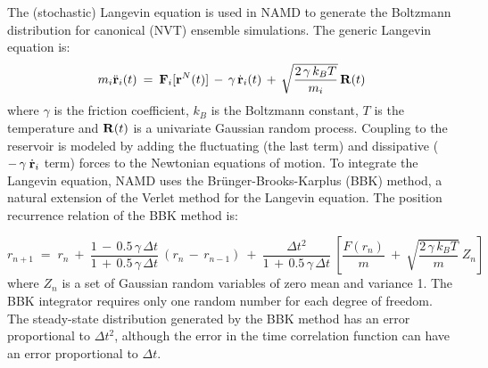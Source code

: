 The (stochastic) Langevin equation is used in NAMD to generate the Boltzmann distribution for canonical (NVT) ensemble simulations. The generic Langevin equation is:
\begin{equation}\label{eq:NVT-Langevin}
m_i \ddot{\bold{r}}_i(t) \:=\: \bold{F}_i[\bold{r}^N(t)] \,-\, \gamma \, \dot{\bold{r}}_i(t) \,+\, \sqrt{\frac{2 \, \gamma \, k_B T}{m_i}} \, \bold{R}(t)
\end{equation}
where $\gamma$ is the friction coefficient, $k_B$ is the Boltzmann constant, $T$ is the temperature and $\bold{R}(t)$ is a univariate Gaussian random process. Coupling to the reservoir is modeled by adding the fluctuating (the last term) and dissipative ($-\,  \gamma \: \dot{\bold{r}}_i $ term) forces to the Newtonian equations of motion. To integrate the Langevin equation, NAMD uses the Br\"{u}nger-Brooks-Karplus (BBK) method, a natural extension of the Verlet method for the Langevin equation. The position recurrence relation of the BBK method is:

\begin{equation}
r_{n+1} \;=\; r_n \:+\: \frac{1 \,-\, 0.5 \, \gamma \, \Delta t}{1 \,+\, 0.5 \, \gamma \, \Delta t} \: (r_n \,-\, r_{n-1}) \:+\: \frac{\Delta t^2}{1 \,+\, 0.5 \, \gamma \, \Delta t} \: \left[ \frac{F(r_n)}{m} \:+\: \sqrt{\frac{2\, \gamma \, k_B T}{m}} \: Z_n \right]
\end{equation}
where $Z_n$ is a set of Gaussian random variables of zero mean and variance 1. The BBK integrator requires only one random number for each degree of freedom. The steady-state distribution generated by the BBK method has an error proportional to $\Delta t^2$, although the error in the time correlation function can have an error proportional to $\Delta t$.

